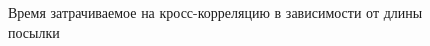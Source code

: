 \documentclass[a4paper,14pt]{extarticle}
\begin{document}
\begin{figure}[H]
\begin{minipage}[h]{0.49\linewidth}
\end{minipage}
\hfill
\begin{minipage}[h]{0.49\linewidth}
\end{minipage}
\caption{Время затрачиваемое на кросс-корреляцию в зависимости от длины посылки}
\label{015}
\end{figure}
\end{document}
